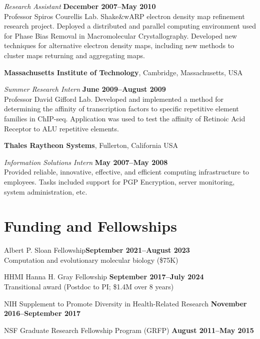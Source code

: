 \documentclass[11pt,notitlepage]{article} %
\begin{document}
{\em Research Assistant} \hfill {\bf December 2007--May 2010}\\
Professor Spiros Courellis Lab. Shake\&wARP electron density map refinement
research project. Deployed a distributed and parallel computing environment used
for Phase Bias Removal in Macromolecular Crystallography. Developed new
techniques for alternative electron density maps, including new methods to
cluster maps returning and aggregating maps.

\bigskip

{\bf Massachusetts Institute of Technology}, Cambridge, Massachusetts,
USA

{\em Summer Research Intern} \hfill {\bf June 2009--August 2009}\\
Professor David Gifford Lab. Developed and implemented a method for
determining the affinity of transcription factors to specific repetitive element
families in ChIP-seq. Application was used to test the affinity of Retinoic
Acid Receptor to ALU repetitive elements.

\bigskip

{\bf Thales Raytheon Systems}, Fullerton, California USA

{\em Information Solutions Intern} \hfill {\bf May 2007--May 2008}\\
Provided reliable, innovative, effective, and efficient computing infrastructure
to employees. Tasks included support for PGP Encryption, server monitoring,
system administration, etc.



\bigskip
\section*{Funding and Fellowships}
\medskip

Albert P. Sloan Fellowship\hfill {\bf September 2021--August 2023}\\
Computation and evolutionary molecular biology (\$75K)

\medskip

HHMI Hanna H. Gray Fellowship \hfill {\bf September 2017--July 2024}\\
Transitional award (Postdoc to PI; \$1.4M over 8 years)

\medskip

NIH Supplement to Promote Diversity in Health-Related Research \hfill {\bf November 2016--September 2017}

\medskip

NSF Graduate Research Fellowship Program (GRFP)
\hfill {\bf August 2011--May 2015}
\end{document}

